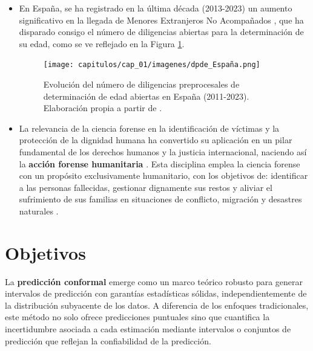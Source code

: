 \begin{itemize}
    \item En España, se ha registrado en la última década (2013-2023) un aumento significativo en la llegada de Menores Extranjeros No Acompañados \cite{fge2024,fge2019,fge2016,fge2013}, que ha disparado consigo el número de diligencias abiertas para la determinación de su edad, como se ve reflejado en la Figura \ref{fig:evolucion_DPDE}.

    \begin{figure}[h]
        \centering
        \texttt{[image: capitulos/cap\_01/imagenes/dpde\_España.png]}
        \caption[
            Evolución del número de diligencias preprocesales de determinación de edad abiertas en España (2011-2023).
        ]{
            Evolución del número de diligencias preprocesales de determinación de edad abiertas en España (2011-2023). Elaboración propia a partir de \cite{fge2013,fge2016,fge2019, fge2024}.
        } 
        \label{fig:evolucion_DPDE}
    \end{figure}

    \item La relevancia de la ciencia forense en la identificación de víctimas y la protección de la dignidad humana ha convertido su aplicación en un pilar fundamental de los derechos humanos y la justicia internacional, naciendo así la  \textbf{acción forense humanitaria} \cite{cordner2017}. Esta disciplina emplea la ciencia forense con un propósito exclusivamente humanitario, con los objetivos de: identificar a las personas fallecidas, gestionar dignamente sus restos y aliviar el sufrimiento de sus familias en situaciones de conflicto, migración y desastres naturales \cite{tidballbinz2021}. 

\end{itemize}


\section{Objetivos}

La \textbf{predicción conformal} emerge como un marco teórico robusto para generar intervalos de predicción con garantías estadísticas sólidas, independientemente de la distribución subyacente de los datos. A diferencia de los enfoques tradicionales, este método no solo ofrece predicciones puntuales sino que cuantifica la incertidumbre asociada a cada estimación mediante intervalos o conjuntos de predicción que reflejan la confiabilidad de la predicción.

